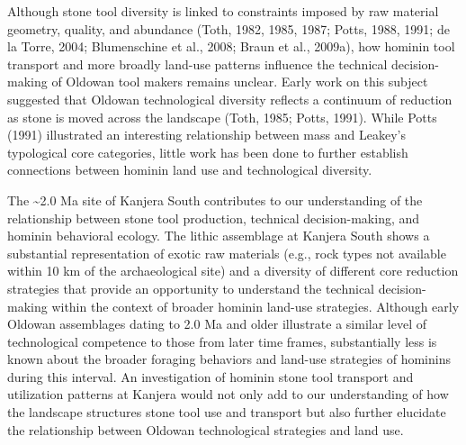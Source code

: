 \documentclass[]{elsarticle} %
\begin{document}
Although stone tool diversity is linked to constraints imposed by raw
material geometry, quality, and abundance (\hspace{0pt}Toth,
1982\hspace{0pt}, \hspace{0pt}1985\hspace{0pt},
\hspace{0pt}1987\hspace{0pt}; \hspace{0pt}Potts, 1988\hspace{0pt},
\hspace{0pt}1991\hspace{0pt}; \hspace{0pt}de la Torre, 2004\hspace{0pt};
\hspace{0pt}Blumenschine et al., 2008\hspace{0pt}; \hspace{0pt}Braun et
al., 2009a\hspace{0pt}), how hominin tool transport and more broadly
land-use patterns influence the technical decision-making of Oldowan
tool makers remains unclear. Early work on this subject suggested that
Oldowan technological diversity reflects a continuum of reduction as
stone is moved across the landscape (\hspace{0pt}Toth, 1985\hspace{0pt};
\hspace{0pt}Potts, 1991\hspace{0pt}). While \hspace{0pt}Potts
(1991)\hspace{0pt} illustrated an interesting relationship between mass
and Leakey's typological core categories, little work has been done to
further establish connections between hominin land use and technological
diversity.

The \textasciitilde2.0 Ma site of Kanjera South contributes to our
understanding of the relationship between stone tool production,
technical decision-making, and hominin behavioral ecology. The lithic
assemblage at Kanjera South shows a substantial representation of exotic
raw materials (e.g., rock types not available within 10 km of the
archaeological site) and a diversity of different core reduction
strategies that provide an opportunity to understand the technical
decision-making within the context of broader hominin land-use
strategies. Although early Oldowan assemblages dating to 2.0 Ma and
older illustrate a similar level of technological competence to those
from later time frames, substantially less is known about the broader
foraging behaviors and land-use strategies of hominins during this
interval. An investigation of hominin stone tool transport and
utilization patterns at Kanjera would not only add to our understanding
of how the landscape structures stone tool use and transport but also
further elucidate the relationship between Oldowan technological
strategies and land use.
\end{document}
